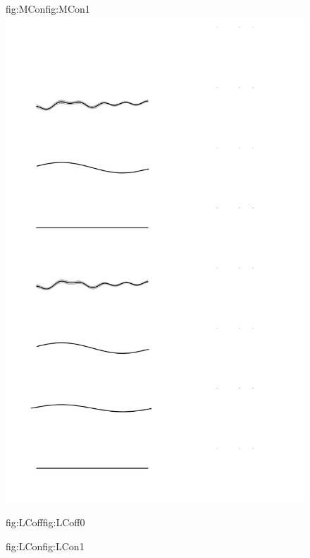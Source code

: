 \begin{figure}
\begin{ocg}{fig:MCon}{fig:MCon}{1}
  \includegraphics[width=0.8\hsize]{figures/analysisC_models.png}%
  \end{ocg}
  \hspace{-0.8\hsize}%
  \begin{ocg}{fig:LCoff}{fig:LCoff}{0}%
  \end{ocg}%
  \begin{ocg}{fig:LCon}{fig:LCon}{1}%

\end{ocg}
\end{figure}

